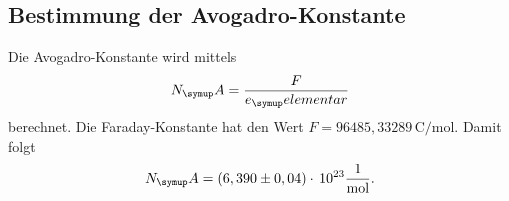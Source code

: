 \subsection{Bestimmung der Avogadro-Konstante}
Die Avogadro-Konstante wird mittels
\begin{equation}
  N_\su{A} = \frac{F}{e_\su{elementar}}
\end{equation}
berechnet. Die Faraday-Konstante hat den Wert $F=96485,33289\,\si{\coulomb\per\mol}$.
Damit folgt
\begin{equation}
  N_\su{A} = (6,390\pm0,04)\cdot\,10^{23}\si[per-mode=fraction]{\per\mol}.
\end{equation}
